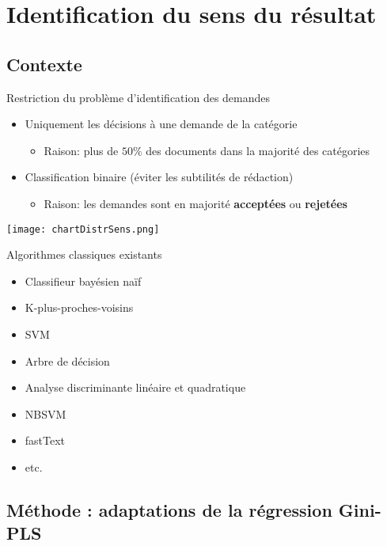 \section{Identification du sens du résultat}


\subsection{Contexte}

\begin{frame}[t]{\mysubsectiontitle}
	Restriction du problème d'identification des demandes
\begin{itemize}	\small
	\item Uniquement les décisions à une demande de la catégorie
	\begin{itemize}\scriptsize
		\item Raison: plus de $50\%$ des documents dans la majorité des catégories
	\end{itemize}
	\item Classification binaire (éviter les subtilités de rédaction)
	\begin{itemize} \scriptsize
		\item Raison: les demandes sont en majorité \textbf{acceptées} ou \textbf{rejetées}
	\end{itemize}
\end{itemize}
\centering \texttt{[image: chartDistrSens.png]}
\end{frame}

\begin{frame}[t]{\mysubsectiontitle}
	Algorithmes classiques existants
	\begin{itemize}
		\item Classifieur bayésien naïf
		\item K-plus-proches-voisins
		\item SVM
		\item Arbre de décision
		\item Analyse discriminante linéaire et quadratique
		\item NBSVM \cite{wang2012nbsvm}
		\item fastText \cite{grave2017fasttextcls}
		\item etc.	
	\end{itemize}
\end{frame}


\subsection{Méthode : adaptations de la régression Gini-PLS}

